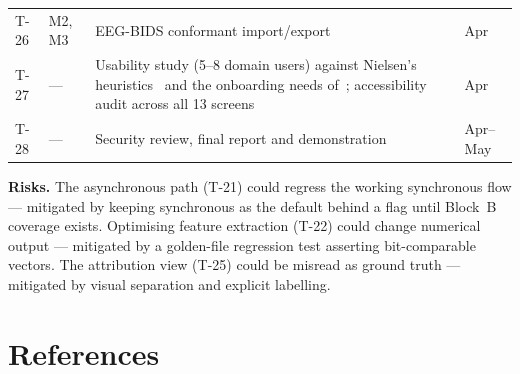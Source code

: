 \documentclass[11pt,a4paper]{article}
\begin{document}
\begin{table}[H]
\begin{tabularx}{\linewidth}{@{}C{0.9cm} C{1.25cm} Y L{1.4cm}@{}}
T-26 & M2, M3 & EEG-BIDS conformant import/export~\cite{pernet2019} & Apr \\
T-27 & --- & Usability study (5--8 domain users) against Nielsen's heuristics~\cite{nielsen1994} and the onboarding needs of~\cite{cai2019}; accessibility audit across all 13 screens & Apr \\
T-28 & --- & Security review, final report and demonstration & Apr--May \\
\bottomrule
\end{tabularx}
\end{table}

\textbf{Risks.} The asynchronous path (T-21) could regress the working
synchronous flow --- mitigated by keeping synchronous as the default behind a
flag until Block~B coverage exists. Optimising feature extraction (T-22) could
change numerical output --- mitigated by a golden-file regression test asserting
bit-comparable vectors. The attribution view (T-25) could be misread as ground
truth --- mitigated by visual separation and explicit labelling.

\section{References}
\end{document}
